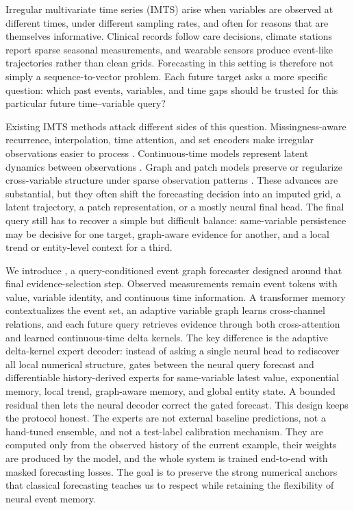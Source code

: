 \documentclass[preprint,12pt]{elsarticle}
\begin{document}
Irregular multivariate time series (IMTS) arise when variables are observed at
different times, under different sampling rates, and often for reasons that are
themselves informative. Clinical records follow care decisions, climate
stations report sparse seasonal measurements, and wearable sensors produce
event-like trajectories rather than clean grids. Forecasting in this setting is
therefore not simply a sequence-to-vector problem. Each future target asks a
more specific question: which past events, variables, and time gaps should be
trusted for this particular future time--variable query?

Existing IMTS methods attack different sides of this question. Missingness-aware
recurrence, interpolation, time attention, and set encoders make irregular
observations easier to process \citep{grud,shukla2019interp,mtan,seft}.
Continuous-time models represent latent dynamics between observations
\citep{neuralode2,latentODE,neuralCDE,cru}. Graph and patch models preserve or
regularize cross-variable structure under sparse observation patterns
\citep{raindrop2,gneuralflow,grafiti,tPatchGNN,apn}. These advances are
substantial, but they often shift the forecasting decision into an imputed
grid, a latent trajectory, a patch representation, or a mostly neural final
head. The final query still has to recover a simple but difficult balance:
same-variable persistence may be decisive for one target, graph-aware evidence
for another, and a local trend or entity-level context for a third.

We introduce \method{}, a query-conditioned event graph forecaster designed
around that final evidence-selection step. Observed measurements remain event
tokens with value, variable identity, and continuous time information. A
transformer memory contextualizes the event set, an adaptive variable graph
learns cross-channel relations, and each future query retrieves evidence through
both cross-attention and learned continuous-time delta kernels. The key
difference is the adaptive delta-kernel expert decoder: instead of asking a
single neural head to rediscover all local numerical structure, \method{} gates
between the neural query forecast and differentiable history-derived experts for
same-variable latest value, exponential memory, local trend, graph-aware memory,
and global entity state. A bounded residual then lets the neural decoder correct
the gated forecast. This design keeps the protocol honest. The experts are not external baseline
predictions, not a hand-tuned ensemble, and not a test-label calibration
mechanism. They are computed only from the observed history of the current
example, their weights are produced by the model, and the whole system is
trained end-to-end with masked forecasting losses. The goal is to preserve the
strong numerical anchors that classical forecasting teaches us to respect while
retaining the flexibility of neural event memory.
\end{document}
